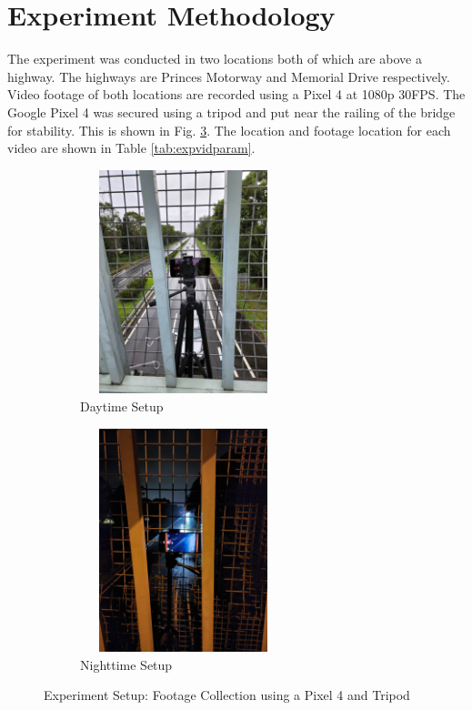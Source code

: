 \documentclass[12pt,a4paper,fleqn]{report}
\begin{document}
\section{Experiment Methodology}
The experiment was conducted in two locations both of which are above a highway. 
The highways are Princes Motorway and Memorial Drive respectively.
Video footage of both locations are recorded using a Pixel 4 at 1080p 30FPS. 
The Google Pixel 4 was secured using a tripod and put near the railing of the bridge for stability.
This is shown in Fig. \ref{fig:experiment_setup}. 
The location and footage location for each video are shown in Table \ref{tab:expvidparam}. 

\begin{figure}[htbp]
    \centering
    \begin{subfigure}[htbp]{0.4\textwidth}
        \begin{center}
            \includegraphics[width=6cm,height=6.5cm]{figures/experiment_setup.jpg}
        \end{center}
        \caption{Daytime Setup}
        \label{fig:daytime_exp}
    \end{subfigure}
    \begin{subfigure}[htbp]{0.4\textwidth}
        \begin{center}
            \includegraphics[width=6cm,height=6.5cm]{figures/night_time_setup.jpg}
        \end{center}
        \caption{Nighttime Setup}
        \label{fig:nighttime_exp}
    \end{subfigure}
    \caption{Experiment Setup: Footage Collection using a Pixel 4 and Tripod}
    \label{fig:experiment_setup}
\end{figure}
\end{document}

